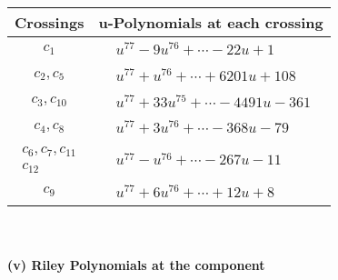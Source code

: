 \documentclass[1p]{elsarticle_modified}
\theoremstyle{definition}
\begin{document}
\begin{tabular}{m{50pt}|m{274pt}}
Crossings & \hspace{64pt}u-Polynomials at each crossing \\
\hline $$\begin{aligned}c_{1}\end{aligned}$$&$\begin{aligned}
&u^{77}-9 u^{76}+\cdots-22 u+1
\end{aligned}$\\
\hline $$\begin{aligned}c_{2},c_{5}\end{aligned}$$&$\begin{aligned}
&u^{77}+u^{76}+\cdots+6201 u+108
\end{aligned}$\\
\hline $$\begin{aligned}c_{3},c_{10}\end{aligned}$$&$\begin{aligned}
&u^{77}+33 u^{75}+\cdots-4491 u-361
\end{aligned}$\\
\hline $$\begin{aligned}c_{4},c_{8}\end{aligned}$$&$\begin{aligned}
&u^{77}+3 u^{76}+\cdots-368 u-79
\end{aligned}$\\
\hline $$\begin{aligned}c_{6},c_{7},c_{11}\\c_{12}\end{aligned}$$&$\begin{aligned}
&u^{77}- u^{76}+\cdots-267 u-11
\end{aligned}$\\
\hline $$\begin{aligned}c_{9}\end{aligned}$$&$\begin{aligned}
&u^{77}+6 u^{76}+\cdots+12 u+8
\end{aligned}$\\
\hline
\end{tabular}\\~\\
\newpage\renewcommand{\arraystretch}{1}
\flushleft \textbf{(v) Riley Polynomials at the component}\newline \\
\end{document}
